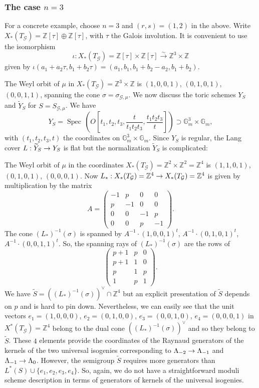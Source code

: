 \documentclass[reqno, 10pt]{amsart}
\makeatletter
\newcommand{\BG}{\ensuremath{\mathbb {G}}\xspace}
\newcommand{\BZ}{\ensuremath{\mathbb {Z}}\xspace}
\newcommand{\CG}{\ensuremath{\mathcal {G}}\xspace}
\DeclareMathOperator{\Spec}{Spec\,}
\newcommand{\wt}{\widetilde}
\theoremstyle{definition}
\numberwithin{equation}{subsection}
\numberwithin{subsubsection}{subsection}
\renewcommand{\to}{%
   \ifbool{@display}{\longrightarrow}{\rightarrow}%
   }
\makeatother
\begin{document}
\subsubsection{The case $n=3$} For a  concrete example, choose $n=3$ and $(r,s)=(1,2)$  in the above. Write $X_*(T_\CG)=\BZ[\tau]\oplus \BZ[\tau]$, with $\tau$ the Galois involution.
It is convenient to use the isomorphism 
\[
\iota: X_*(T_\CG)=\BZ[\tau]\times \BZ[\tau]\xrightarrow{\sim} \BZ^3\times \BZ
\]
 given by
$
\iota (a_1+a_2\tau, b_1+b_2\tau)= (a_1, b_1, b_1+b_2-a_2, b_1+b_2).
$
 

The Weyl orbit of $\mu$ in $X_*(T_\CG)=\BZ^3\times\BZ$ is $(1,0,0,1)$, $(0,1,0,1)$, $(0,0,1,1)$, spanning the cone $\sigma=\sigma_{\CG,\mu}$.
We now discuss the toric schemes $Y_S$ and $\wt Y_S$ for $S=S_{\CG,\mu}$. We have
\[
Y_S=\Spec(O[t_1, t_2, t_3, \frac{t}{t_1t_2t_3}, \frac{t_1t_2t_3}{t}])\supset \BG_m^3\times\BG_m,
\]
with $(t_1,t_2,t_3,t)$ the   coordinates on $\BG_m^3\times\BG_m$. Since $Y_S$ is regular, the Lang cover $L: \wt Y_S\to Y_S$
is flat but the normalization $ \wt Y_S$ is complicated:
 
The Weyl orbit of $\mu$ in the coordinates $X_*(T_\CG)=\BZ^2\times\BZ^2=\BZ^4$ is $(1,1,0,1)$, $(0,1,0,1)$, $ (0,0,0,1)$.
Now $L_*: X_*(T_\CG)=\BZ^4\to X_*(T_\CG)=\BZ^4$ is given by multiplication by the matrix
\[
A=\begin{pmatrix}
-1&p&0&0\\
p&-1&0&0\\
0&0&-1&p\\
0&0&p&-1
\end{pmatrix}.
\]
The cone $(L_*)^{-1}(\sigma)$ is spanned by $A^{-1}\cdot (1,0,0,1)^t$, $A^{-1}\cdot (0,1,0,1)^t$, $A^{-1}\cdot (0,0,1,1)^t$. So,
the spanning rays of $(L_*)^{-1}(\sigma)$ are the rows of 
\[
\begin{pmatrix}
p+1&p&0\\
p+1&1&0\\
p&1&p\\
1&p&1
\end{pmatrix}.
\]
We have $\wt S=((L_*)^{-1}(\sigma))^\vee\cap \BZ^4$ but an explicit presentation of $\wt S$ depends on $p$ and is hard to pin down. Nevertheless, we can easily see that the unit vectors $e_1=(1,0,0,0)$, $e_2=(0,1,0,0)$, $e_3=(0,0,1,0)$, $e_4=(0,0,0,1)$ in $X^*(T_\CG)=\BZ^4$ belong
 to the dual cone $((L_*)^{-1}(\sigma))^\vee$ and so they belong to $\wt S$. These $4$ elements provide
 the coordinates of the Raynaud generators of the kernels of the two universal isogenies corresponding to $\Lambda_{-2}\to \Lambda_{-1}$ and $\Lambda_{-1}\to \Lambda_0$. However, the semigroup $\wt S$  requires more generators than $L^*(S)\cup\{e_1,e_2,e_3,e_4\}$. So, again, we do not have a straightforward moduli scheme description in terms of generators of kernels of the universal isogenies.
\end{document}
